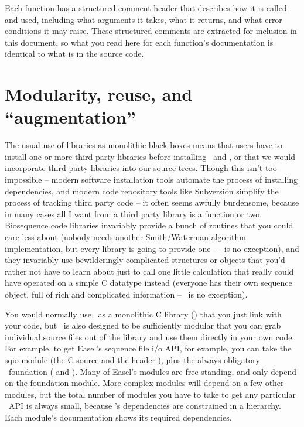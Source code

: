 Each function has a structured comment header that describes how it is
called and used, including what arguments it takes, what it returns,
and what error conditions it may raise. These structured comments are
extracted for inclusion in this document, so what you read here for
each function's documentation is identical to what is in the source
code.

\section{Modularity, reuse, and ``augmentation''}

The usual use of libraries as monolithic black boxes means that users
have to install one or more third party libraries before installing
\HMMER\ and \Infernal, or that we would incorporate third party
libraries into our source trees. Though this isn't too impossible --
modern software installation tools automate the process of installing
dependencies, and modern code repository tools like Subversion
simplify the process of tracking third party code -- it often seems
awfully burdensome, because in many cases all I want from a third
party library is a function or two. Biosequence code libraries
invariably provide a bunch of routines that you could care less about
(nobody needs another Smith/Waterman algorithm implementation, but
every library is going to provide one -- \Easel\ is no exception), and
they invariably use bewilderingly complicated structures or objects
that you'd rather not have to learn about just to call one little
calculation that really could have operated on a simple C datatype
instead (everyone has their own sequence object, full of rich and
complicated information -- \Easel\ is no exception).

You would normally use \Easel\ as a monolithic C library
() that you just link with your code, but \Easel\ is
also designed to be sufficiently modular that you can grab individual
source files out of the library and use them directly in your own
code. For example, to get Easel's sequence file i/o API, for example,
you can take the sqio module (the C source  and the
header ), plus the always-obligatory \Easel\
foundation ( and ). Many of Easel's
modules are free-standing, and only depend on the foundation
 module. More complex modules will depend on a few other
modules, but the total number of modules you have to take to get any
particular \Easel\ API is always small, because \Easel's dependencies
are constrained in a hierarchy. Each module's documentation shows its
required dependencies.

